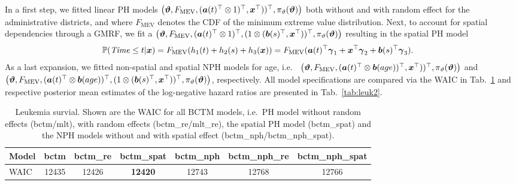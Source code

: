 \documentclass[12pt]{article}
\theoremstyle{plain}
\newcommand{\bctm}[2]{\big( \varthetavec, \allowbreak {#1},\allowbreak {#2}, \allowbreak\pi_\vartheta(\varthetavec)\big)}
\begin{document}
In a first step, we fitted  linear PH models $\bctm{F_{\text{MEV}}}{(\avec(t)^\top \otimes 1)^\top, \xvec^\top))^\top}$ both without and with random effect for the administrative districts, and where $F_{\text{MEV}}$ denotes the CDF of the minimum extreme value distribution. 
Next, to account for spatial dependencies through a GMRF, we fit a $\bctm{F_{\text{MEV}}}{(\avec(t)^\top \otimes 1)^\top,(1 \otimes (\bvec(s)^\top, \xvec^\top))^\top}$  resulting in the spatial PH model
\begin{align*}
\mathbb{P}(\mathit{Time} \leq t |\text{\boldmath$x$}) &= F_{\text{MEV}}(h_1(t)  + h_2(s) + h_3(\text{\boldmath$x$}))= F_{\text{MEV}}(\text{\boldmath$a$}(t)^\top \text{\boldmath$\gamma$}_1  +\text{\boldmath$x$}^\top \text{\boldmath$\gamma$}_2 + \text{\boldmath$b$}(s)^\top \text{\boldmath$\gamma$}_3).
\end{align*}
As a last expansion, we fitted  non-spatial and spatial NPH models for age, i.e. ~$\bctm{F_{\text{MEV}}}{(\avec(t)^\top \otimes \bvec(age))^\top, \xvec^\top))^\top}$ and $\bctm{F_{\text{MEV}}}{(\avec(t)^\top \otimes \bvec(age))^\top,(1 \otimes (\bvec(s)^\top, \xvec^\top))^\top}$, respectively.  All model specifications are compared via the WAIC in Tab.~\ref{tab:leuk:waic} and respective posterior mean estimates of the log-negative hazard ratios are presented in Tab.~\ref{tab:leuk2}. 
\begin{table}\footnotesize
\centering
\begin{tabular}{l|cccccc}
  \hline  \hline
Model & bctm  & bctm\_re & bctm\_spat & bctm\_nph & bctm\_nph\_re  & bctm\_nph\_spat \\  \hline
WAIC &  12435 & 12426 & \textbf{12420} & 12743 & 12768 & 12766\\
  \hline  \hline
\end{tabular}\caption{\small  Leukemia survial. Shown are the WAIC for all BCTM models, i.e.~PH model without random effects (bctm/mlt), with random effects (bctm\_re/mlt\_re), the spatial PH model (bctm\_spat) and the NPH models without and with spatial effect (bctm\_nph/bctm\_nph\_spat).} \label{tab:leuk:waic}
\end{table}
\end{document}
